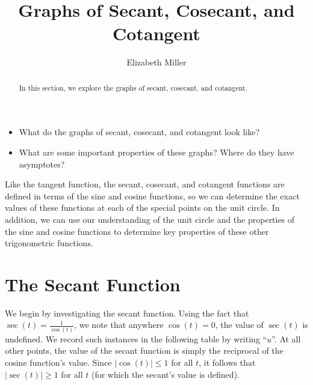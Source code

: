 \documentclass[nooutcomes, noauthor]{ximera}
\author{Elizabeth Miller}
\title{Graphs of Secant, Cosecant, and Cotangent}
\begin{document}
\licenseAPC
\begin{abstract}
 In this section, we explore the graphs of secant, cosecant, and cotangent.
\end{abstract}
\maketitle
\licenseAPC


\begin{motivatingQuestions}\begin{itemize}
\item What do the graphs of secant, cosecant, and cotangent look like?
\item What are some important properties of these graphs?  Where do they have asymptotes?
\end{itemize}\end{motivatingQuestions}



Like the tangent function, the secant, cosecant, and cotangent functions are defined in terms of the sine and cosine functions, so we can determine the exact values of these functions at each of the special points on the unit circle.  In addition, we can use our understanding of the unit circle and the properties of the sine and cosine functions to determine key properties of these other trigonometric functions.  


\section{The Secant Function}

We begin by investigating the secant function.  Using the fact that \(\sec(t) = \frac{1}{\cos(t)}\), we note that anywhere \(\cos(t) = 0\), the value of \(\sec(t)\) is undefined.  We record such instances in the following table by writing ``\(u\)''.  At all other points, the value of the secant function is simply the reciprocal of the cosine function's value.  Since \(|\cos(t)| \le 1\) for all \(t\), it follows that \(|\sec(t)| \ge 1\) for all \(t\) (for which the secant's value is defined).
\end{document}
